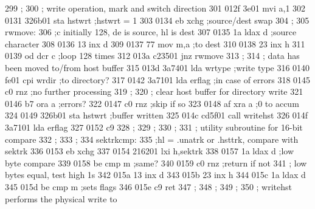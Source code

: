 299                ;
300                ;         write operation, mark and switch direction
301    012f 3e01             mvi      a,1
302    0131 326b01           sta      hstwrt                 ;hstwrt = 1
303    0134 eb               xchg                            ;source/dest swap
304                ;
305                rwmove:
306                          ;c initially 128, de is source, hl is dest
307    0135 1a               ldax     d                      ;source character
308    0136 13               inx      d
309    0137 77               mov      m,a                    ;to dest
310    0138 23               inx      h
311    0139 od               dcr      c                      ;loop 128 times
312    013a c23501           jnz      rwmove
313                ;
314                ;         data has been moved to/from host buffer
315    013d 3a7401           lda      wrtype                 ;write type
316    0140 fe01             cpi      wrdir                  ;to directory?
317    0142 3a7101           lda      erflag                 ;in case of errors
318    0145 c0               rnz                             ;no further processing
319                ;
320                ;         clear host buffer for directory write
321    0146 b7               ora      a                      ;errors?
322    0147 c0               rnz                             ;skip if so
323    0148 af               xra      a                      ;0 to accum
324    0149 326b01           sta      hstwrt                 ;buffer written
325    014c cd5f01           call     writehst
326    014f 3a7101           lda      erflag
327    0152 c9
328                ;
329                ;
330                ;
331                ;         utility subroutine for 16-bit compare
332                ;
333                ;
334                sektrkcmp:
335                          ;hl = .unatrk or .hsttrk, compare with sektrk
336    0153 eb               xchg
337    0154 216201           lxi      h,sektrk
338    0157 1a               ldax     d                      ;low byte compare
339    0158 be               cmp      m                      ;same?
340    0159 c0               rnz                             ;return if not
341                ;         low bytes equal, test high 1s
342    015a 13               inx      d
343    015b 23               inx      h
344    015c 1a               ldax     d
345    015d be               cmp      m                  ;sets flags
346    015e c9               ret
347                ;
348                ;
349                ;
350                ;         writehst performs the physical write to
